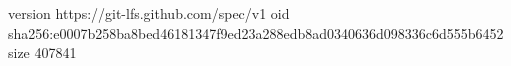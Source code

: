 version https://git-lfs.github.com/spec/v1
oid sha256:e0007b258ba8bed46181347f9ed23a288edb8ad0340636d098336c6d555b6452
size 407841
